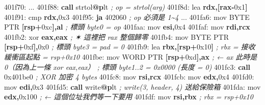 \documentclass[10pt,a4paper]{article}
\newenvironment{Shaded}{\begin{snugshade}}{\end{snugshade}}
\newcommand{\BaseNTok}[1]{\textcolor[rgb]{0.00,0.00,0.81}{#1}}
\newcommand{\BuiltInTok}[1]{#1}
\newcommand{\CommentTok}[1]{\textcolor[rgb]{0.56,0.35,0.01}{\textit{#1}}}
\newcommand{\ControlFlowTok}[1]{\textcolor[rgb]{0.13,0.29,0.53}{\textbf{#1}}}
\newcommand{\DataTypeTok}[1]{\textcolor[rgb]{0.13,0.29,0.53}{#1}}
\newcommand{\DecValTok}[1]{\textcolor[rgb]{0.00,0.00,0.81}{#1}}
\newcommand{\ErrorTok}[1]{\textcolor[rgb]{0.64,0.00,0.00}{\textbf{#1}}}
\newcommand{\FunctionTok}[1]{\textcolor[rgb]{0.13,0.29,0.53}{\textbf{#1}}}
\newcommand{\KeywordTok}[1]{\textcolor[rgb]{0.13,0.29,0.53}{\textbf{#1}}}
\newcommand{\NormalTok}[1]{#1}
\newcommand{\OperatorTok}[1]{\textcolor[rgb]{0.81,0.36,0.00}{\textbf{#1}}}
\renewenvironment{Shaded}{%
  \def\FrameCommand{\fboxsep=3.2pt\colorbox{shadecolor}}%
  \MakeFramed{\advance\hsize-\width\FrameRestore\small}%
}{%
  \endMakeFramed
}
\begin{document}
\begin{Shaded}
\begin{Highlighting}[]
\NormalTok{401f70:  ...}
\NormalTok{401f88:  }\ControlFlowTok{call}\NormalTok{ strtol}\FunctionTok{@}\ErrorTok{p}\NormalTok{lt             }\CommentTok{; op = strtol(arg)}
\NormalTok{401f8d:  }\BuiltInTok{lea}  \KeywordTok{rdx}\OperatorTok{,[}\KeywordTok{rax}\OperatorTok{{-}}\BaseNTok{0x1}\OperatorTok{]}
\NormalTok{401f91:  }\BuiltInTok{cmp}  \KeywordTok{rdx}\OperatorTok{,}\BaseNTok{0x3}
\NormalTok{401f95:  }\ControlFlowTok{ja}   \DecValTok{402060}                 \CommentTok{; op 必須是 1\textasciitilde{}4}
\NormalTok{...}
\NormalTok{401fa6:  }\BuiltInTok{mov}  \DataTypeTok{BYTE} \DataTypeTok{PTR} \OperatorTok{[}\KeywordTok{rsp}\OperatorTok{+}\BaseNTok{0xc}\OperatorTok{],}\KeywordTok{al}         \CommentTok{; 標頭 byte0 = op}
\NormalTok{401faa:  }\BuiltInTok{mov}  \KeywordTok{esi}\OperatorTok{,}\BaseNTok{0x4}
\NormalTok{401faf:  }\BuiltInTok{mov}  \KeywordTok{rdi}\OperatorTok{,}\KeywordTok{rcx}
\NormalTok{401fb2:  }\BuiltInTok{xor}  \KeywordTok{eax}\OperatorTok{,}\KeywordTok{eax}                       \CommentTok{; ✶ 這裡把 rax 整個歸零}
\NormalTok{401fb4:  }\BuiltInTok{mov}  \DataTypeTok{BYTE} \DataTypeTok{PTR} \OperatorTok{[}\KeywordTok{rsp}\OperatorTok{+}\BaseNTok{0xf}\OperatorTok{],}\BaseNTok{0x0}        \CommentTok{; 標頭 byte3 = pad = 0}
\NormalTok{401fb9:  }\BuiltInTok{lea}  \KeywordTok{rbx}\OperatorTok{,[}\KeywordTok{rsp}\OperatorTok{+}\BaseNTok{0x10}\OperatorTok{]}                \CommentTok{; rbx = 接收緩衝區起點 = rsp+0x10}
\NormalTok{401fbe:  }\BuiltInTok{mov}  \DataTypeTok{WORD} \DataTypeTok{PTR} \OperatorTok{[}\KeywordTok{rsp}\OperatorTok{+}\BaseNTok{0xd}\OperatorTok{],}\KeywordTok{ax}         \CommentTok{; ← ax 此時是 0（因為上一條 xor eax,eax）}
                                            \CommentTok{;   標頭 byte1..2 = 0x0000  (長度 = 0)}
\NormalTok{401fc3:  }\ControlFlowTok{call} \BaseNTok{0x401be0}                      \CommentTok{; XOR 加密 4 bytes}
\NormalTok{401fc8:  }\BuiltInTok{mov}  \KeywordTok{rsi}\OperatorTok{,}\KeywordTok{rcx}
\NormalTok{401fcb:  }\BuiltInTok{mov}  \KeywordTok{edx}\OperatorTok{,}\BaseNTok{0x4}
\NormalTok{401fd0:  }\BuiltInTok{mov}  \KeywordTok{edi}\OperatorTok{,}\BaseNTok{0x3}
\NormalTok{401fd5:  }\ControlFlowTok{call}\NormalTok{ write}\FunctionTok{@}\ErrorTok{p}\NormalTok{lt                     }\CommentTok{; write(3, header, 4) 送給保險箱}
\NormalTok{401fda:  }\BuiltInTok{mov}  \KeywordTok{edx}\OperatorTok{,}\BaseNTok{0x100}                     \CommentTok{; ← 這個位址我們等一下要用}
\NormalTok{401fdf:  }\BuiltInTok{mov}  \KeywordTok{rsi}\OperatorTok{,}\KeywordTok{rbx}                       \CommentTok{; rbx = rsp+0x10}

\end{Highlighting}
\end{Shaded}
\end{document}
